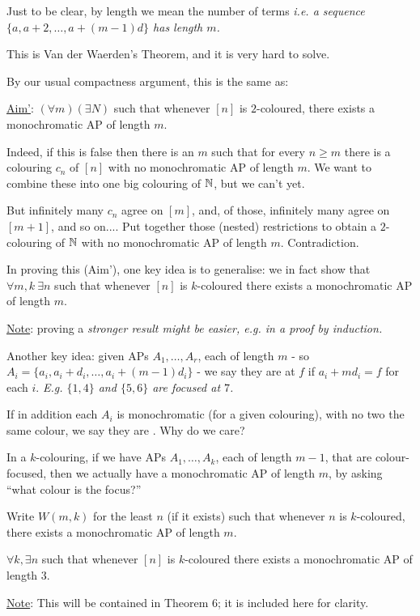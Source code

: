 \documentclass[10pt]{article}
\begin{document}
Just to be clear, by length we mean the number of terms \it{i.e.} a sequence $\{a, a + 2,\dots, a+(m-1)d\}$ has length $m$.

This is Van der Waerden's Theorem, and it is very hard to solve.

By our usual compactness argument, this is the same as:

\underline{Aim'}: $(\forall m)(\exists N)$ such that whenever $[n]$ is $2$-coloured, there exists a monochromatic AP of length $m$.

Indeed, if this is false then there is an $m$ such that for every $n \ge m$ there is a colouring $c_n$ of $[n]$ with no monochromatic AP of length $m$. We want to combine these into one big colouring of $\mathbb{N}$, but we can't yet.

But infinitely many $c_n$ agree on $[m]$, and, of those, infinitely many agree on $[m+1]$, and so on.... Put together those (nested) restrictions to obtain a $2$-colouring of $\mathbb{N}$ with no monochromatic AP of length $m$. Contradiction.

In proving this (Aim'), one key idea is to generalise: we in fact show that $\forall m,k\ \exists n$ such that whenever $[n]$ is $k$-coloured there exists a monochromatic AP of length $m$.

\underline{Note}: proving a \it{stronger} result might be \it{easier}, \it{e.g.} in a proof by induction.

Another key idea: given APs $A_1,\dots,A_r$, each of length $m$ - so $A_i = \{a_i,a_i+d_i,\dots,a_i+(m-1)d_i\}$ - we say they are  at $f$ if $a_i + md_i = f$ for each $i$. \it{E.g.} $\{1,4\}$ and $\{5,6\}$ are focused at $7$.

If in addition each $A_i$ is monochromatic (for a given colouring), with no two the same colour, we say they are . Why do we care?

In a $k$-colouring, if we have APs $A_1,\dots,A_k$, each of length $m-1$, that are colour-focused, then we actually have a monochromatic AP of length $m$, by asking ``what colour is the focus?''

Write $W(m,k)$ for the least $n$ (if it exists) such that whenever $n$ is $k$-coloured, there exists a monochromatic AP of length $m$.

\begin{prop}
    $\forall k, \exists n$ such that whenever $[n]$ is $k$-coloured there exists a monochromatic AP of length $3$.
\end{prop}
\underline{Note}: This will be contained in Theorem 6; it is included here for clarity.
\end{document}
